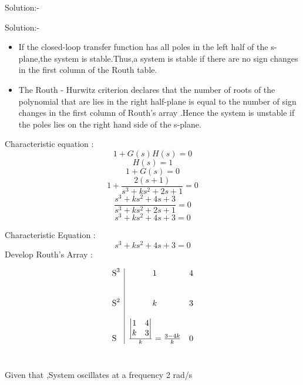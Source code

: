 \documentclass[journal,12pt,twocolumn]{IEEEtran}
\begin{document}
\begin{frame}{Solution:- }
\begin{frame}{Solution:- }
\begin{tikzpicture}[auto, node distance=2.5cm,>=latex']
     
\end{tikzpicture}

\end{frame}
\begin{frame}{}
\begin{itemize}
\\
Routh's Stability Condition
\\
   \item If the closed-loop transfer function has all poles in the left half of the s-plane,the system is stable.Thus,a system is stable if there are no sign changes in the first column of the Routh table.
   \item The Routh - Hurwitz criterion declares that the number of roots of the polynomial that are lies in the right half-plane is equal to the number of sign changes in the first column of Routh's array .Hence the system is unstable if the poles lies on the right hand side of the s-plane.
   
\end{itemize}

\end{frame}

\begin{frame}{}
Characteristic equation : $$1 + G(s)H(s) = 0$$
$$H(s) = 1 $$
$$ 1 + G(s) = 0$$
$$ 1 + \frac{2(s+1)}{s^3 + ks^2 + 2s +1} = 0$$
$$ \frac{s^3+ks^2+4s+3}{s^3 + ks^2 + 2s +1} = 0 $$
$$ s^3+ks^2+4s+3 = 0$$
\end{frame}

\begin{frame}{}
Characteristic Equation :\\
$$s^3+ks^2+4s+3 = 0$$
Develop Routh's Array :\\
\begin{centre}
\[ \begin{array}{l|c  r}
\mbox S^3 & 1 & 4 \\~\\~\\
\mbox S^2 & k & 3 \\~\\
\mbox S & \frac{\begin{vmatrix}
1 & 4 \\ 
k & 3 \\  
\end{vmatrix}}{k} = \frac{3 - 4k}{k} & 0 \end{array}\] 
\\
\end{centre}
\end{frame}
\begin{frame}{}
 Given that ,System oscillates at a frequency 2 rad/s \\
\begin{itemize}


\end{itemize}
\end{frame}
\end{frame}
\end{document}
